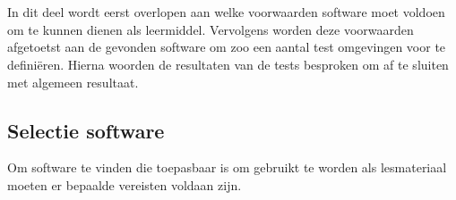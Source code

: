 
\chapter{}
\label{ch:methodologie}
In dit deel wordt eerst overlopen aan welke voorwaarden software moet voldoen om te kunnen dienen als leermiddel. Vervolgens worden deze voorwaarden afgetoetst aan de gevonden software om zoo een aantal test omgevingen voor te definiëren. Hierna woorden de resultaten van de tests besproken om af te sluiten met algemeen resultaat.



\section{Selectie software}
Om software te vinden die toepasbaar is om gebruikt te worden als lesmateriaal moeten er bepaalde vereisten voldaan zijn.

